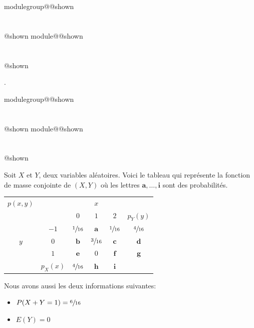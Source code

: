 \documentclass{Evaluation}
\makeatletter
\newcommand{\currentmodulekey}{}
\newcommand{\currentmoduletitle}{}
\newcommand{\currentgroupkey}{}
\newcommand{\currentgrouptitle}{}
\newcommand{\showmoduleifneeded}{%
  \ifx\currentgroupkey\empty\else
    \expandafter\ifx\csname modulegroup@\currentgroupkey @shown\endcsname\relax
      \section*{\currentgrouptitle}%
      \expandafter\gdef\csname modulegroup@\currentgroupkey @shown\endcsname{1}%
    \fi
  \fi
  \expandafter\ifx\csname module@\currentmodulekey @shown\endcsname\relax
    \section*{\currentmoduletitle}%
    \expandafter\gdef\csname module@\currentmodulekey @shown\endcsname{1}%
  \fi
}
\newenvironment{A23}{\showmoduleifneeded}{}
\makeatother
\begin{document}
\begin{questions}
\begin{A23}

 .
\end{A23}

\begin{A23}
\question {} %
Soit $X$ et $Y$, deux variables aléatoires.
Voici le tableau qui représente la fonction de masse conjointe de $(X, Y)$ où les lettres $\boldsymbol{a},\hdots,\boldsymbol{i}$ sont des probabilités.

\begin{center}
\large{
\begin{tabular}{cc|ccc|c}
$p(x,y)$    &       &               & $x$ &     &\\
            &       & $0$           & $1$ & $2$ & $p_Y(y)$\\ 
 \hline
            & $-1$ & $\sfrac{1}{16}$ & $\boldsymbol{a}$  & $\sfrac{1}{16}$ &$\sfrac{4}{16}$\\

 $y$        & $0$   &     $\boldsymbol{b}$          &$\sfrac{3}{16}$   &  $\boldsymbol{c}$& $\boldsymbol{d}$\\
            & $1$   &       $\boldsymbol{e}$        &  $0$& $\boldsymbol{f}$ & $\boldsymbol{g}$\\
\hline
&$p_X(x)$   & $\sfrac{4}{16}$  &$\boldsymbol{h}$ &$\boldsymbol{i}$& \\
\end{tabular}
}
 \end{center}

    
Nous avons aussi les deux informations suivantes:
\begin{itemize}
    \item $P(X+Y=1)=\displaystyle \sfrac{6}{16}$
    \item $E(Y)=0$
\end{itemize}

\begin{parts}

\end{parts}
\end{A23}
\end{questions}
\end{document}
